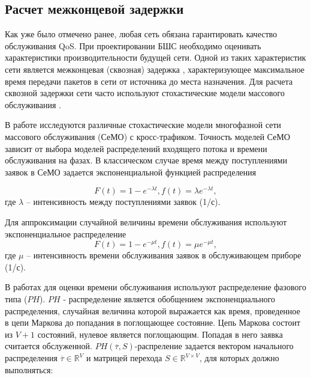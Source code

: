 \FloatBarrier
\subsection{Расчет межконцевой задержки}\label{part4_e2e_delay_section}


Как уже было отмечено ранее, любая сеть обязана гарантировать качество обслуживания QoS. При проектировании БШС необходимо оценивать характеристики производительности будущей сети. Одной из таких характеристик сети является межконцевая (сквозная) задержка \cite{Vishnevsky2016_Methods_of_performance, Wang2017, Liu2016, Chen2019, Hosni2017, Capone2019, Abbas2017, Seliem2019, Malandra2018, Kalor2018, Larionov2019, Gao2016}, характеризующее максимальное время передачи пакетов в сети от источника до места назначения. Для расчета сквозной задержки сети часто используют стохастические модели массового обслуживания \cite{Vishnevsky2016_Methods_of_performance, Wang2017, Liu2016, Malandra2018, Larionov2019, Gao2016}. 


В работе исследуются различные стохастические модели многофазной сети массового обслуживания (СеМО) с кросс-трафиком. Точность моделей СеМО зависит от выбора моделей распределений входящего потока и времени обслуживания на фазах. В классическом случае время между поступлениями заявок в СеМО задается экспоненциальной функцией распределения \cite{VishnevskyBook, Kleinrock1975}

\begin{displaymath}
  F(t) = 1 - e^{-\lambda t}, f(t) = \lambda e^{-\lambda t},
\end{displaymath}
где $\lambda$ -- интенсивность между поступлениями заявок (1/с).

Для аппроксимации случайной величины времени обслуживания используют экспоненциальное распределение
\begin{displaymath}
  F(t) = 1 - e^{-\mu t}, f(t) = \mu e^{-\mu t},
\end{displaymath}
где $\mu$ -- интенсивность времени обслуживания заявок в обслуживающем приборе (1/с).


В работах \cite{Vishnevsky2017, Vishnevsky2016_Methods_of_performance, Larionov2019, Kawanishi2019, Dogan2021} для оценки времени обслуживания  используют распределение фазового типа ($PH$). $PH$ - распределение является обобщением экспоненциального распределения, случайная величина которой выражается как время, проведенное в цепи Маркова до попадания в поглощающее состояние. Цепь Маркова состоит из $V+1$ состояний, нулевое является поглощающим. Попадая в него заявка считается обслуженной. $PH(\overline{\tau}, S)$-распреление задается вектором начального распределения $\overline{\tau} \in \mathbb{R}^V$ и  матрицей перехода $S \in \mathbb{R}^{V \times V}$, для которых должно выполняться:


